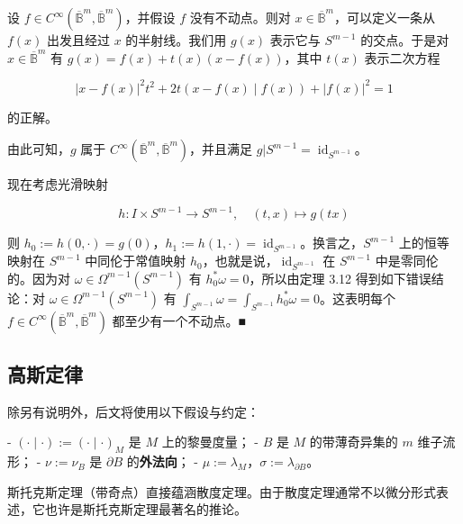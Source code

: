 \begin{theorem}
\begin{subitems}
\item

设 $ f \in C^\infty(\overline{\mathbb{B}}^m,\overline{\mathbb{B}}^m) $，并假设 $ f $ 没有不动点。则对 $ x \in \overline{\mathbb{B}}^m $，可以定义一条从 $ f(x) $ 出发且经过 $ x $ 的半射线。我们用 $ g(x) $ 表示它与 $ S^{m-1} $ 的交点。于是对 $ x \in \overline{\mathbb{B}}^m $ 有 $ g(x) = f(x) + t(x)(x - f(x)) $，其中 $ t(x) $ 表示二次方程

\[
|x - f(x)|^2 t^2 + 2t(x - f(x) \mid f(x)) + |f(x)|^2 = 1
\]

的正解。

\end{subitems}


由此可知，$ g $ 属于 $ C^\infty(\overline{\mathbb{B}}^m,\overline{\mathbb{B}}^m) $，并且满足 $ g|S^{m-1} = \operatorname{id}_{S^{m-1}} $。

现在考虑光滑映射

\[
h : I \times S^{m-1} \to S^{m-1}, \quad (t,x) \mapsto g(tx)
\]

则 $ h_0 := h(0,\cdot) = g(0) $，$ h_1 := h(1,\cdot) = \operatorname{id}_{S^{m-1}} $。换言之，$ S^{m-1} $ 上的恒等映射在 $ S^{m-1} $ 中同伦于常值映射 $ h_0 $，也就是说，$ \operatorname{id}_{S^{m-1}} $ 在 $ S^{m-1} $ 中是零同伦的。因为对 $ \omega \in \Omega^{m-1}(S^{m-1}) $ 有 $ h_0^*\omega = 0 $，所以由定理 3.12 得到如下错误结论：对 $ \omega \in \Omega^{m-1}(S^{m-1}) $ 有 $ \int_{S^{m-1}} \omega = \int_{S^{m-1}} h_0^*\omega = 0 $。这表明每个 $ f \in C^\infty(\overline{\mathbb{B}}^m,\overline{\mathbb{B}}^m) $ 都至少有一个不动点。\nobreak\hspace{0.35em}■

\end{theorem}

\subsection*{高斯定律}

除另有说明外，后文将使用以下假设与约定：

- $ (\cdot \mid \cdot) := (\cdot \mid \cdot)_M $ 是 $ M $ 上的黎曼度量；
- $ B $ 是 $ M $ 的带薄奇异集的 $ m $ 维子流形；
- $ \nu := \nu_B $ 是 $ \partial B $ 的\textbf{外法向}；
- $ \mu := \lambda_M $，$ \sigma := \lambda_{\partial B} $。

斯托克斯定理（带奇点）直接蕴涵散度定理。由于散度定理通常不以微分形式表述，它也许是斯托克斯定理最著名的推论。


